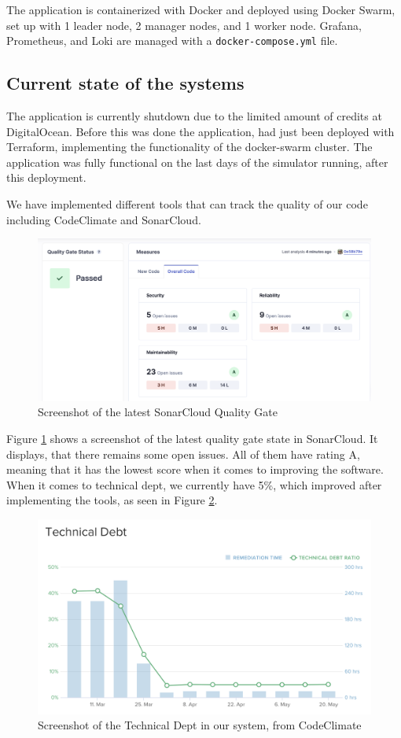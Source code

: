 The application is containerized with Docker and deployed using Docker Swarm, set up with 1 leader node, 2 manager nodes, and 1 worker node. Grafana, Prometheus, and Loki are managed with a \texttt{docker-compose.yml} file.

\subsection{Current state of the systems}
The application is currently shutdown due to the limited amount of credits at DigitalOcean. 
Before this was done the application, had just been deployed with Terraform, implementing the functionality of the docker-swarm cluster. The application was fully functional on the last days of the simulator running, after this deployment.\newline

We have implemented different tools that can track the quality of our code including CodeClimate and SonarCloud.

\begin{figure}[H]
    \centering
    \includegraphics[width=\textwidth]{images/QualityGate.png}
    \caption{Screenshot of the latest SonarCloud Quality Gate}
    \label{img:qualitygate}
\end{figure}

\noindent Figure \ref{img:qualitygate} shows a screenshot of the latest quality gate state in SonarCloud. It displays, that there remains some open issues.  All of them have rating A, meaning that it has the lowest score when it comes to improving the software. \cite{codeclimate} When it comes to technical dept, we currently have 5\%, which improved after implementing the tools, as seen in Figure \ref{img:technical dept}. 

\begin{figure}[H]
    \centering
    \includegraphics[width=\textwidth]{images/Technical Debt.png}
    \caption{Screenshot of the Technical Dept in our system, from CodeClimate}
    \label{img:technical dept}
\end{figure}



